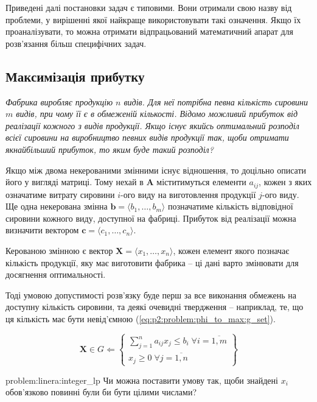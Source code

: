 \documentclass[\main/book.tex]{subfiles}
\begin{document}
Приведені далі постановки задач є типовими. Вони отримали свою назву від проблеми, у вирішенні якої найкраще використовувати такі означення. Якщо їх проаналізувати, то можна отримати відпрацьований математичний апарат для розв'язання більш специфічних задач.

\subsection{Максимізація прибутку}
\label{section:linear:phi_to_max}

\textit{Фабрика виробляє продукцію $n$ видів. Для неї потрібна певна кількість сировини $m$ видів, при чому її є в обмеженій кількості. Відомо можливий прибуток від реалізації кожного з видів продукції. Якщо існує якийсь оптимальний розподіл всієї сировини на виробництво певних видів продукції так, щоби отримати якнайбільший прибуток, то яким буде такий розподіл?}

Якщо між двома некерованими змінними існує відношення, то доцільно описати його у вигляді матриці. Тому нехай в $\mathbf{A}$ міститимуться елементи $a_{ij}$, кожен з яких означатиме витрату сировини $i$-ого виду на виготовлення продукції $j$-ого виду. Ще одна некерована змінна $\mathbf{b} = \langle b_1, \ldots, b_m \rangle$ позначатиме кількість відповідної сировини кожного виду, доступної на фабриці. Прибуток від реалізації можна визначити вектором $\mathbf{c} = \langle c_1, \ldots, c_n \rangle$.

Керованою змінною є вектор $\mathbf{X} = \langle x_1, \ldots, x_n \rangle$, кожен елемент якого позначає кількість продукції, яку має виготовити фабрика -- ці дані варто змінювати для досягнення оптимальності.

Тоді умовою допустимості розв'язку буде перш за все виконання обмежень на доступну кількість сировини, та деякі очевидні твердження -- наприклад, те, що ця кількість має бути невід'ємною (\ref{eq:p2:problem:phi_to_max:g_set}).

\begin{equation}
 \mathbf{X} \in G \Leftarrow
 \left\{
  \begin{array}{l}
   \displaystyle \sum_{j=1}^n a_{ij} x_j \leq b_i\;
   \forall i = \overline{1, m} \\
   x_j \geq 0 \; \forall j = \overline{1, n}
  \end{array}
 \right\}
 \label{eq:p2:problem:phi_to_max:g_set}
\end{equation}

\begin{problem}{problem:linera:integer_lp}
Чи можна поставити умову так, щоби знайдені $x_i$ обов'язково повинні були би бути цілими числами?
\end{problem}
\end{document}
